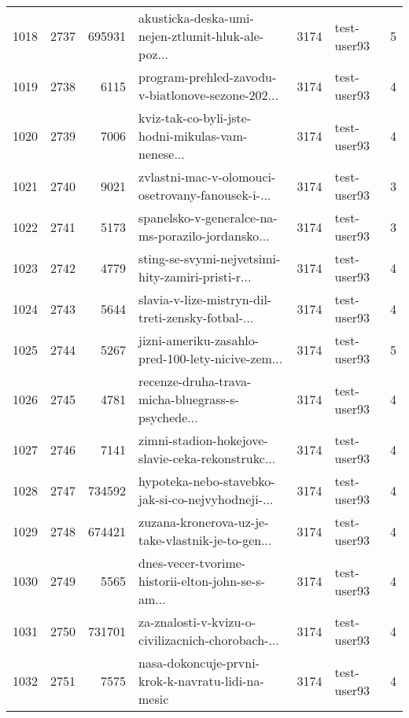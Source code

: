 \begin{tabular}{lrrlrlr}
1018 &       2737 &   695931 &  akusticka-deska-umi-nejen-ztlumit-hluk-ale-poz... &     3174 &                  test-user93 &               5 \\
1019 &       2738 &     6115 &  program-prehled-zavodu-v-biatlonove-sezone-202... &     3174 &                  test-user93 &               4 \\
1020 &       2739 &     7006 &  kviz-tak-co-byli-jste-hodni-mikulas-vam-nenese... &     3174 &                  test-user93 &               4 \\
1021 &       2740 &     9021 &  zvlastni-mac-v-olomouci-osetrovany-fanousek-i-... &     3174 &                  test-user93 &               3 \\
1022 &       2741 &     5173 &  spanelsko-v-generalce-na-ms-porazilo-jordansko... &     3174 &                  test-user93 &               3 \\
1023 &       2742 &     4779 &  sting-se-svymi-nejvetsimi-hity-zamiri-pristi-r... &     3174 &                  test-user93 &               4 \\
1024 &       2743 &     5644 &  slavia-v-lize-mistryn-dil-treti-zensky-fotbal-... &     3174 &                  test-user93 &               4 \\
1025 &       2744 &     5267 &  jizni-ameriku-zasahlo-pred-100-lety-nicive-zem... &     3174 &                  test-user93 &               5 \\
1026 &       2745 &     4781 &  recenze-druha-trava-micha-bluegrass-s-psychede... &     3174 &                  test-user93 &               4 \\
1027 &       2746 &     7141 &  zimni-stadion-hokejove-slavie-ceka-rekonstrukc... &     3174 &                  test-user93 &               4 \\
1028 &       2747 &   734592 &  hypoteka-nebo-stavebko-jak-si-co-nejvyhodneji-... &     3174 &                  test-user93 &               4 \\
1029 &       2748 &   674421 &  zuzana-kronerova-uz-je-take-vlastnik-je-to-gen... &     3174 &                  test-user93 &               4 \\
1030 &       2749 &     5565 &  dnes-vecer-tvorime-historii-elton-john-se-s-am... &     3174 &                  test-user93 &               4 \\
1031 &       2750 &   731701 &  za-znalosti-v-kvizu-o-civilizacnich-chorobach-... &     3174 &                  test-user93 &               4 \\
1032 &       2751 &     7575 &  nasa-dokoncuje-prvni-krok-k-navratu-lidi-na-mesic &     3174 &                  test-user93 &               4 \\

\end{tabular}
